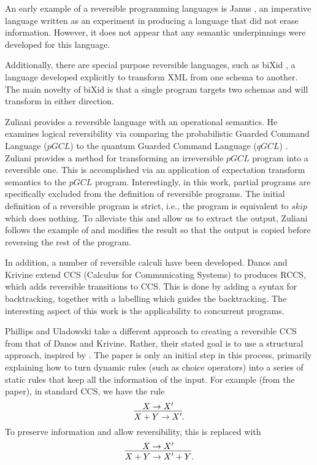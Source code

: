 An early example of a reversible programming languages is Janus \cite{lutz1986janus}, an imperative
language written as an experiment in producing a language that did not erase information. However,
it does not appear that any semantic underpinnings were developed for this language.

Additionally, there are special purpose reversible languages, such as biXid \cite{bixid06}, a
language developed explicitly to transform XML \cite{xml} from one schema to another. The main
novelty of biXid is that a single program targets two schemas and will transform in either direction.

Zuliani \cite{zuliani01:reversibility} provides a reversible language with an operational
semantics. He examines logical reversibility via comparing the probabilistic Guarded Command
Language ($pGCL$) \cite{MorganIver99} to the quantum Guarded Command Language ($qGCL$)
\cite{sanders:quantum}. Zuliani provides a method for transforming an irreversible $pGCL$ program
into a reversible one. This is accomplished via an application of expectation transform semantics to
the $pGCL$ program. Interestingly, in this work, partial programs are specifically excluded from the
definition of reversible programs. The initial definition of a reversible program is strict, i.e.,
the program is equivalent to $skip$ which does nothing. To alleviate this and allow us to extract
the output, Zuliani follows the example of \cite{bennett:1973reverse} and modifies the result so
that the output is copied before reversing the rest of the program.

In addition, a number of reversible calculi have been developed. Danos and Krivine
\cite{danos2004reversible} extend CCS (Calculus for Communicating Systems)
\cite{milner1980calculus,milner1989communication} to produces RCCS, which adds reversible
transitions to CCS. This is done by adding a syntax for backtracking, together with a labelling
which guides the backtracking. The interesting aspect of this work is the applicability to
concurrent programs.

Phillips and Uladowski \cite{phillips2006operational} take a different approach to creating a
reversible CCS from that of Danos and Krivine. Rather, their stated goal is to use a structural
approach, inspired by \cite{abramsky05:reversible}. The paper is only an initial step in this
process, primarily explaining how to turn dynamic rules (such as choice operators) into a series of
static rules that keep all the information of the input. For example (from the paper), in standard
CCS, we have the rule
\[
  \infer{X+Y \to X'}{X\to X'}.
\]
To preserve information and allow reversibility, this is replaced with
\[
  \infer{X+Y \to X' +Y}{X\to X'}.
\]

